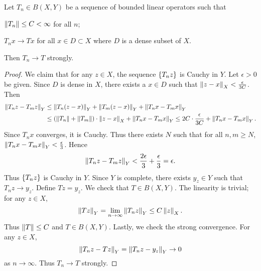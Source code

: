 \begin{theorem}
    Let $T_n\in B(X,Y)$ be a sequence of bounded linear operators such that 
    \begin{thmenum}
        \item $\left\lVert {T_n} \right\rVert\leq C<\infty$ for all $n$; 
        \item $T_nx\to Tx$ for all $x\in D\subset X$ where $D$ is a dense 
        subset of $X$. 
    \end{thmenum}
    Then $T_n\to T$ strongly.
\end{theorem}
\begin{proof}
    We claim that for any $z\in X$, the sequence $\left\{ {T_nz} \right\}$ is Cauchy in $Y$. 
    Let $\epsilon>0$ be given. Since $D$ is dense in $X$, there exists 
    a $x\in D$ such that $\left\lVert {z - x} \right\rVert_X<\frac{\epsilon}{3C}$. Then 
    \begin{equation*}
        \begin{split}
            \left\lVert {T_nz - T_mz} \right\rVert_Y &\leq \left\lVert {T_n(z - x)} \right\rVert_Y + \left\lVert {T_m(z - x)} \right\rVert_Y + 
            \left\lVert {T_nx - T_mx} \right\rVert_Y \\
            &\leq (\left\lVert {T_n} \right\rVert + \left\lVert {T_m} \right\rVert)\cdot \left\lVert {z - x} \right\rVert_X + \left\lVert {T_nx - T_mx} \right\rVert_Y
            \leq 2C\cdot\frac{\epsilon}{3C} + \left\lVert {T_nx - T_mx} \right\rVert_Y.
        \end{split}
    \end{equation*}
    Since $T_nx$ converges, it is Cauchy. Thus there exists $N$ such that for all 
    $n,m\geq N$, $\left\lVert {T_nx - T_mx} \right\rVert_Y<\frac{\epsilon}{3}$. Hence 
    \begin{equation*}
        \left\lVert {T_nz - T_mz} \right\rVert_Y < \frac{2\epsilon}{3} + \frac{\epsilon}{3} = \epsilon.
    \end{equation*}
    Thus $\left\{ {T_nz} \right\}$ is Cauchy in $Y$. Since $Y$ is complete, there exists 
    $y_z\in Y$ such that $T_nz\to y_z$. Define $Tz = y_z$. We check that 
    $T\in B(X,Y)$. The linearity is trivial; for any $z\in X$, 
    \begin{equation*}
        \left\lVert {Tz} \right\rVert_Y = \lim_{n\to\infty} \left\lVert {T_nz} \right\rVert_Y\leq C\left\lVert {z} \right\rVert_X.
    \end{equation*}
    Thus $\left\lVert {T} \right\rVert\leq C$ and $T\in B(X,Y)$. Lastly, we check the 
    strong convergence. For any $z\in X$, 
    \begin{equation*}
        \left\lVert {T_nz - Tz} \right\rVert_Y = \left\lVert {T_nz - y_z} \right\rVert_Y\to 0
    \end{equation*}
    as $n\to\infty$. Thus $T_n\to T$ strongly.
\end{proof}

